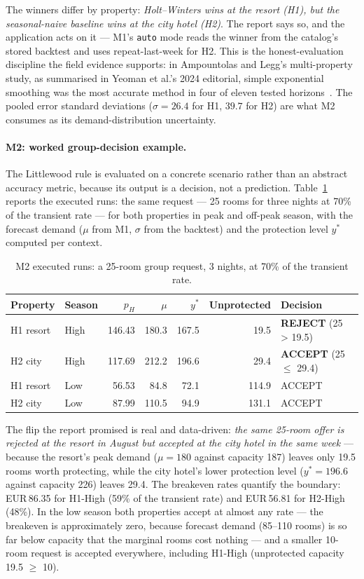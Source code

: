 The winners differ by property: \emph{Holt--Winters wins at the resort (H1), but the seasonal-naive baseline wins at the city hotel (H2)}. The report says so, and the application acts on it --- M1's \texttt{auto} mode reads the winner from the catalog's stored backtest and uses repeat-last-week for H2. This is the honest-evaluation discipline the field evidence supports: in Ampountolas and Legg's multi-property study, as summarised in Yeoman et al.'s 2024 editorial, simple exponential smoothing was the most accurate method in four of eleven tested horizons~\cite{yeoman2024}. The pooled error standard deviations ($\sigma = 26.4$ for H1, $39.7$ for H2) are what M2 consumes as its demand-distribution uncertainty.

\paragraph{M2: worked group-decision example.}
The Littlewood rule is evaluated on a concrete scenario rather than an abstract accuracy metric, because its output is a decision, not a prediction. Table~\ref{tab:m2demo} reports the executed runs: the same request --- 25 rooms for three nights at 70\% of the transient rate --- for both properties in peak and off-peak season, with the forecast demand ($\mu$ from M1, $\sigma$ from the backtest) and the protection level $y^{*}$ computed per context.

\begin{table}[H]
\centering
\caption{M2 executed runs: a 25-room group request, 3 nights, at 70\% of the transient rate.}
\label{tab:m2demo}
\begin{tabular}{@{}llrrrrl@{}}
\toprule
\textbf{Property} & \textbf{Season} & $p_H$ & $\mu$ & $y^{*}$ & \textbf{Unprotected} & \textbf{Decision} \\
\midrule
H1 resort & High & 146.43 & 180.3 & 167.5 & 19.5 & \textbf{REJECT} (25 > 19.5) \\
H2 city & High & 117.69 & 212.2 & 196.6 & 29.4 & \textbf{ACCEPT} (25 $\le$ 29.4) \\
H1 resort & Low & 56.53 & 84.8 & 72.1 & 114.9 & ACCEPT \\
H2 city & Low & 87.99 & 110.5 & 94.9 & 131.1 & ACCEPT \\
\bottomrule
\end{tabular}
\end{table}

The flip the report promised is real and data-driven: \emph{the same 25-room offer is rejected at the resort in August but accepted at the city hotel in the same week} --- because the resort's peak demand ($\mu = 180$ against capacity 187) leaves only 19.5 rooms worth protecting, while the city hotel's lower protection level ($y^{*} = 196.6$ against capacity 226) leaves 29.4. The breakeven rates quantify the boundary: EUR\,86.35 for H1-High (59\% of the transient rate) and EUR\,56.81 for H2-High (48\%). In the low season both properties accept at almost any rate --- the breakeven is approximately zero, because forecast demand (85--110 rooms) is so far below capacity that the marginal rooms cost nothing --- and a smaller 10-room request is accepted everywhere, including H1-High (unprotected capacity 19.5 $\ge$ 10).

